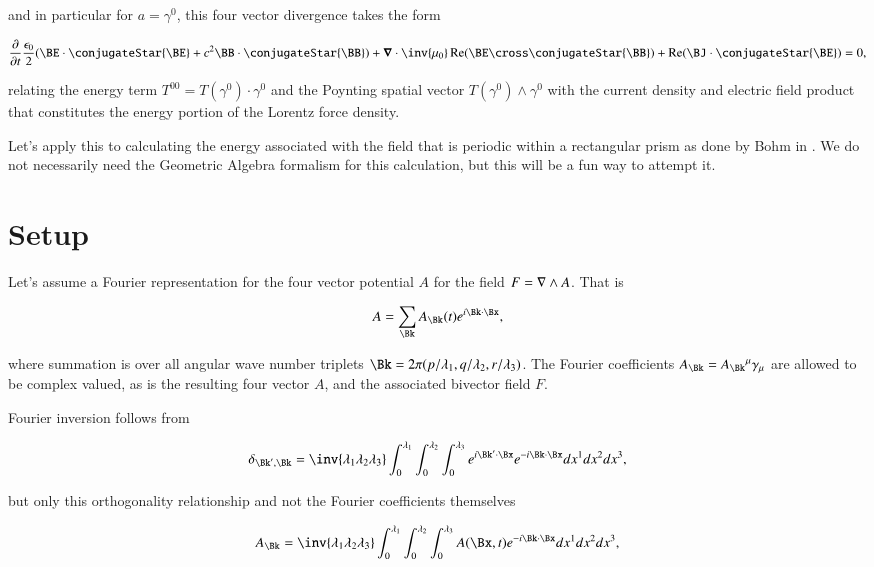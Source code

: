 and in particular for $a = \gamma^0$, this four vector divergence takes the form

\begin{align}\label{eqn:fourierMaxVac:4}
\PD{t}{}\frac{\epsilon_0}{2}(\BE \cdot \conjugateStar{\BE} + c^2 \BB \cdot \conjugateStar{\BB})
+ \spacegrad \cdot \inv{\mu_0} \Real (\BE \cross \conjugateStar{\BB} )
+ \Real( \BJ \cdot \conjugateStar{\BE} ) 
= 0,
\end{align}

relating the energy term $T^{00} = T(\gamma^0) \cdot \gamma^0$ and the Poynting spatial vector $T(\gamma^0) \wedge \gamma^0$ with the current density and electric field product that constitutes the energy portion of the Lorentz force density.

Let's apply this to calculating the energy associated with the field that is periodic within a rectangular prism as done by Bohm in \cite{bohm1989qt}.  We do not necessarily need the Geometric Algebra formalism for this calculation, but this will be a fun way to attempt it.

\section{Setup}

Let's assume a Fourier representation for the four vector potential $A$ for the field $F = \nabla \wedge A$.  That is

\begin{align}
\label{eqn:fourierMaxVac:5}
A = \sum_{\Bk} A_\Bk(t) e^{i \Bk \cdot \Bx},
\end{align}

where summation is over all angular wave number triplets $\Bk = 2 \pi (p/\lambda_1,q/\lambda_2,r/\lambda_3)$.  The Fourier coefficients $A_\Bk = {A_\Bk}^\mu \gamma_\mu$ are allowed to be complex valued, as is the resulting four vector $A$, and the associated bivector field $F$.

Fourier inversion follows from

\begin{align}\label{eqn:fourierMaxVac:6}
\delta_{\Bk', \Bk} =
\inv{ \lambda_1 \lambda_2 \lambda_3 }
\int_0^{\lambda_1}
\int_0^{\lambda_2}
\int_0^{\lambda_3} 
e^{ i \Bk' \cdot \Bx} 
e^{-i \Bk \cdot \Bx} dx^1 dx^2 dx^3,
\end{align}

but only this orthogonality relationship and not the Fourier coefficients themselves

\begin{align}
\label{eqn:fourierMaxVac:7}
A_\Bk = 
\inv{ \lambda_1 \lambda_2 \lambda_3 }
\int_0^{\lambda_1}
\int_0^{\lambda_2}
\int_0^{\lambda_3} A(\Bx, t) e^{- i \Bk \cdot \Bx} dx^1 dx^2 dx^3,
\end{align}

